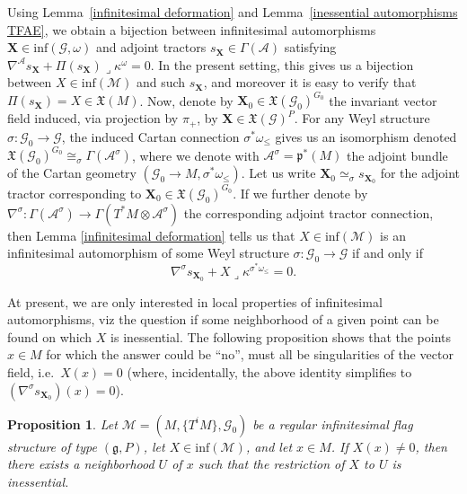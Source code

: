 \documentclass[pdftex]{sigma}
\def\k{\kappa}
\def\g{\mathfrak{g}}
\def\p{\mathfrak{p}}
\def\Abdle{\mathcal{A}}
\def\Gbdle{\mathcal{G}}
\def\VF{\mathfrak{X}}
\def\:{\lrcorner}
\def\tens{\otimes}
\def\isom{\cong}
\theoremstyle{plain}
\newtheorem{Proposition}[Theorem]{Proposition}
\theoremstyle{definition}
\begin{document}
Using Lemma~\ref{infinitesimal deformation} and Lemma~\ref{inessential automorphisms TFAE}, we obtain a bijection between inf\/initesimal automorphisms $\mathbf{X} \in \mathrm{inf}(\Gbdle,\omega)$ and adjoint tractors $s_{\mathbf{X}} \in \Gamma(\Abdle)$ satisfying $\nabla^{\Abdle}s_{\mathbf{X}} + \Pi(s_{\mathbf{X}}) \: \k^{\omega} = 0$. In the present setting, this gives us a bijection between $X \in \mathrm{inf}(\mathcal{M})$ and such $s_{\mathbf{X}}$, and moreover it is easy to verify that $\Pi(s_{\mathbf{X}}) = X \in \VF(M)$. Now, denote by $\mathbf{X}_0 \in \VF(\Gbdle_0)^{G_0}$ the invariant vector f\/ield induced, via projection by $\pi_+$, by $\mathbf{X} \in \VF(\Gbdle)^P$. For any Weyl structure $\sigma: \Gbdle_0 \rightarrow \Gbdle$, the induced Cartan connection $\sigma^*\omega_{\leq}$ gives us an isomorphism denoted $\VF(\Gbdle_0)^{G_0} \isom_{\sigma} \Gamma(\Abdle^{\sigma})$, where we denote with $\Abdle^{\sigma} = \p^*(M)$ the adjoint bundle of the Cartan geometry $(\Gbdle_0 \rightarrow M,\sigma^*\omega_{\leq})$. Let us write $\mathbf{X}_0 \simeq_{\sigma} s_{\mathbf{X}_0}$ for the adjoint tractor corresponding to $\mathbf{X}_0 \in \VF(\Gbdle_0)^{G_0}$. If we further denote by $\nabla^{\sigma}: \Gamma(\Abdle^{\sigma}) \rightarrow \Gamma(T^*M\tens\Abdle^{\sigma})$ the corresponding adjoint tractor connection, then Lemma \ref{infinitesimal deformation} tells us that $X \in \mathrm{inf}(\mathcal{M})$ is an inf\/initesimal automorphism of some Weyl structure $\sigma: \Gbdle_0 \rightarrow \Gbdle$ if and only if
\[
\nabla^{\sigma} s_{\mathbf{X}_0} + X \: \k^{\sigma^*\omega_{\leq}} = 0.
\]

At present, we are only interested in local properties of inf\/initesimal automorphisms, viz the question if some neighborhood of a given point can be found on which $X$ is inessential. The following proposition shows that the points $x \in M$ for which the answer could be ``no'', must all be singularities of the vector f\/ield, i.e.\ $X(x)=0$ (where, incidentally, the above identity simplif\/ies to $(\nabla^{\sigma} s_{\mathbf{X}_0})(x) = 0$).

\begin{Proposition} \label{non-singular points} Let $\mathcal{M} = (M,\{T^iM\},\Gbdle_0)$ be a regular infinitesimal flag structure of type $(\g,P)$, let $X \in \mathrm{inf}(\mathcal{M})$, and let $x \in M$. If $X(x) \neq 0$, then there exists a neighborhood $U$ of $x$ such that the restriction of $X$ to $U$ is inessential.
\end{Proposition}
\end{document}
